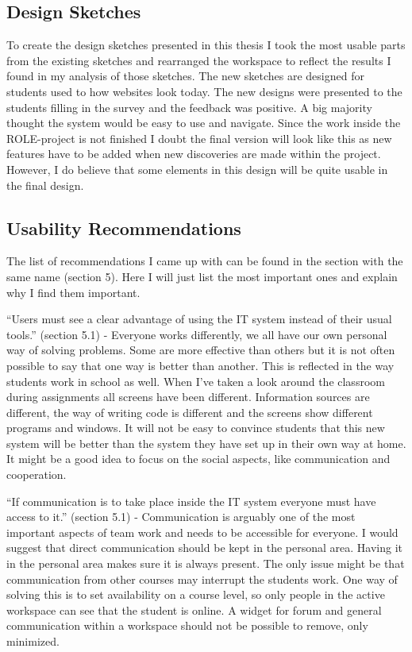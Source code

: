 \subsection {Design Sketches}

To create the design sketches presented in this thesis I took the most usable parts from the existing sketches and rearranged the workspace to reflect the results I found in my analysis of those sketches. The new sketches are designed for students used to how websites look today. The new designs were presented to the students filling in the survey and the feedback was positive. A big majority thought the system would be easy to use and navigate. Since the work inside the ROLE-project is not finished I doubt the final version will look like this as new features have to be added when new discoveries are made within the project. However, I do believe that some elements in this design will be quite usable in the final design.

\subsection {Usability Recommendations}
The list of recommendations I came up with can be found in the section with the same name (section 5). Here I will just list the most important ones and explain why I find them important.

“Users must see a clear advantage of using the IT system instead of their usual tools.” (section 5.1) - Everyone works differently, we all have our own personal way of solving problems. Some are more effective than others but it is not often possible to say that one way is better than another. This is reflected in the way students work in school as well. When I've taken a look around the classroom during assignments all screens have been different. Information sources are different, the way of writing code is different and the screens show different programs and windows. It will not be easy to convince students that this new system will be better than the system they have set up in their own way at home. It might be a good idea to focus on the social aspects, like communication and cooperation.

“If communication is to take place inside the IT system everyone must have access to it.” (section 5.1) - Communication is arguably one of the most important aspects of team work and needs to be accessible for everyone. I would suggest that direct communication should be kept in the personal area. Having it in the personal area makes sure it is always present. The only issue might be that communication from other courses may interrupt the students work. One way of solving this is to set availability on a course level, so only people in the active workspace can see that the student is online. A widget for forum and general communication within a workspace should not be possible to remove, only minimized.

